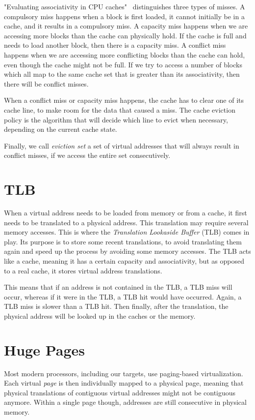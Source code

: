\documentclass[a4paper,11pt,oneside]{report}
\begin{document}
"Evaluating associativity in CPU caches"~\cite{3C} distinguishes three types of misses. A compulsory miss happens when a block is first loaded, it cannot initially be in a cache, and it results in a compulsory miss. A capacity miss happens when we are accessing more blocks than the cache can physically hold. If the cache is full and needs to load another block, then there is a capacity miss. A conflict miss happens when we are accessing more conflicting blocks than the cache can hold, even though the cache might not be full. If we try to access a number of blocks which all map to the same cache set that is greater than its associativity, then there will be conflict misses.

When a conflict miss or capacity miss happens, the cache has to clear one of its cache line, to make room for the data that caused a miss. The cache eviction policy is the algorithm that will decide which line to evict when necessary, depending on the current cache state.

Finally, we call \emph{eviction set} a set of virtual addresses that will always result in conflict misses, if we access the entire set consecutively.

\section{TLB}

When a virtual address needs to be loaded from memory or from a cache, it first needs to be translated to a physical address. This translation may require several memory accesses. This is where the \emph{Translation Lookaside Buffer} (TLB) comes in play. Its purpose is to store some recent translations, to avoid translating them again and speed up the process by avoiding some memory accesses. The TLB acts like a cache, meaning it has a certain capacity and associativity, but as opposed to a real cache, it stores virtual address translations. 

This means that if an address is not contained in the TLB, a TLB miss will occur, whereas if it were in the TLB, a TLB hit would have occurred. Again, a TLB miss is slower than a TLB hit. Then finally, after the translation, the physical address will be looked up in the caches or the memory.

\section{Huge Pages}

Most modern processors, including our targets, use paging-based virtualization. Each virtual \emph{page} is then individually mapped to a physical page, meaning that physical translations of contiguous virtual addresses might not be contiguous anymore. Within a single page though, addresses are still consecutive in physical memory.
\end{document}
